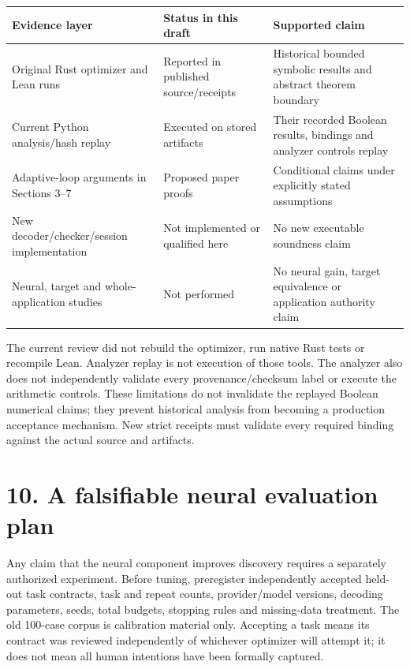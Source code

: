 \documentclass[11pt]{article}
\begin{document}
\begingroup\small\setlength{\tabcolsep}{4pt}
\begin{longtable}{@{}>{\raggedright\arraybackslash}p{}>{\raggedright\arraybackslash}p{}>{\raggedright\arraybackslash}p{}@{}}
\toprule
\textbf{Evidence layer} & \textbf{Status in this draft} & \textbf{Supported claim} \\
\midrule\endhead
Original Rust optimizer and Lean runs & Reported in published source/receipts & Historical bounded symbolic results and abstract theorem boundary \\
Current Python analysis/hash replay & Executed on stored artifacts & Their recorded Boolean results, bindings and analyzer controls replay \\
Adaptive-loop arguments in Sections 3--7 & Proposed paper proofs & Conditional claims under explicitly stated assumptions \\
New decoder/checker/session implementation & Not implemented or qualified here & No new executable soundness claim \\
Neural, target and whole-application studies & Not performed & No neural gain, target equivalence or application authority claim \\
\bottomrule
\end{longtable}
\endgroup

The current review did not rebuild the optimizer, run native Rust tests or recompile Lean. Analyzer replay is not execution of those tools. The analyzer also does not independently validate every provenance/checksum label or execute the arithmetic controls. These limitations do not invalidate the replayed Boolean numerical claims; they prevent historical analysis from becoming a production acceptance mechanism. New strict receipts must validate every required binding against the actual source and artifacts.

\section{10. A falsifiable neural evaluation plan}

Any claim that the neural component improves discovery requires a separately authorized experiment. Before tuning, preregister independently accepted held-out task contracts, task and repeat counts, provider/model versions, decoding parameters, seeds, total budgets, stopping rules and missing-data treatment. The old 100-case corpus is calibration material only. Accepting a task means its contract was reviewed independently of whichever optimizer will attempt it; it does not mean all human intentions have been formally captured.
\end{document}
